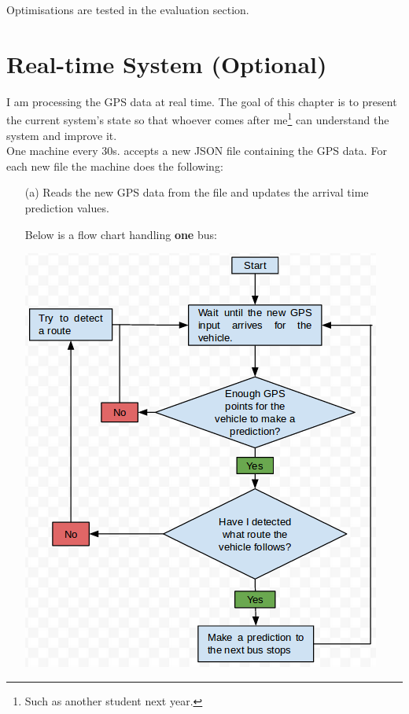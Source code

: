 \documentclass[12pt,a4paper,oneside,openright]{report}
\begin{document}
Optimisations are tested in the evaluation section.


\newpage

\section{Real-time System (Optional)}

I am processing the GPS data at real time. The goal of this chapter is to present
the current system's state so that whoever comes after
me\footnote{Such as another student next year.} can understand the system and
improve it. \\

One machine every 30s. accepts a new JSON file containing the GPS data. For each new
file the machine does the following:

\begin{enumerate}

\item[(a)] Reads the new GPS data from the file and updates the arrival time
prediction values.

Below is a flow chart handling
\textbf{one} bus:

\includegraphics[scale = 0.6]{figs/flowchart.png} \\


\end{enumerate}
\end{document}
